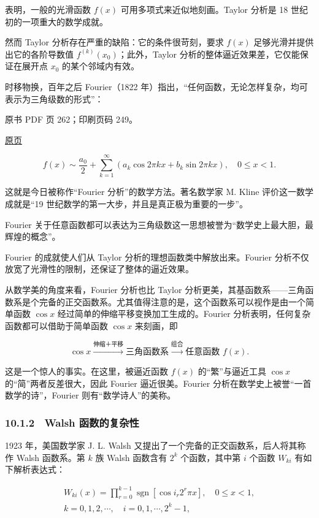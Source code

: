 表明，一般的光滑函数 \(f(x)\) 可用多项式来近似地刻画。Taylor 分析是 18 世纪初的一项重大的数学成就。

然而 Taylor 分析存在严重的缺陷：它的条件很苛刻，要求 \(f(x)\) 足够光滑并提供出它的各阶导数值 \(f^{(k)}(x_0)\)；此外，Taylor 分析的整体逼近效果差，它仅能保证在展开点 \(x_0\) 的某个邻域内有效。

时移物换，百年之后 Fourier（1822 年）指出，``任何函数，无论怎样复杂，均可表示为三角级数的形式''：

\clearpage

原书 PDF 页 262；印刷页码 249。

\href{source-images/pdf-262.jpeg}{原页}

\[
f(x)\sim\frac{a_0}{2}+\sum_{k=1}^{\infty}(a_k\cos2\pi kx+b_k\sin2\pi kx),\quad 0\leqslant x<1.
\]

这就是今日被称作``Fourier 分析''的数学方法。著名数学家 M. Kline 评价这一数学成就是``19 世纪数学的第一大步，并且是真正极为重要的一步''。

Fourier 关于任意函数都可以表达为三角级数这一思想被誉为``数学史上最大胆，最辉煌的概念''。

Fourier 的成就使人们从 Taylor 分析的理想函数类中解放出来。Fourier 分析不仅放宽了光滑性的限制，还保证了整体的逼近效果。

从数学美的角度来看，Fourier 分析也比 Taylor 分析更美，其基函数系------三角函数系是个完备的正交函数系。尤其值得注意的是，这个函数系可以视作是由一个简单函数 \(\cos x\) 经过简单的伸缩平移变换加工生成的。Fourier 分析表明，任何复杂函数都可以借助于简单函数 \(\cos x\) 来刻画，即

\[
\cos x\xrightarrow{\text{伸缩＋平移}}\text{三角函数系}\xrightarrow{\text{组合}}\text{任意函数 }f(x).
\]

这是一个惊人的事实。在这里，被逼近函数 \(f(x)\) 的``繁''与逼近工具 \(\cos x\) 的``简''两者反差很大，因此 Fourier 逼近很美。Fourier 分析在数学史上被誉``一首数学的诗''，Fourier 则有``数学诗人''的美称。

\subsubsection{10.1.2　Walsh 函数的复杂性}\label{ch10-walsh-ux51fdux6570ux7684ux590dux6742ux6027}

1923 年，美国数学家 J. L. Walsh 又提出了一个完备的正交函数系，后人将其称作 Walsh 函数系。第 \(k\) 族 Walsh 函数含有 \(2^k\) 个函数，其中第 \(i\) 个函数 \(W_{ki}\) 有如下解析表达式：

\[
\begin{gathered}
W_{ki}(x)=\prod_{r=0}^{k-1}\operatorname{sgn}[\cos i_r2^r\pi x],\quad 0\leqslant x<1,\\
k=0,1,2,\cdots,\quad i=0,1,\cdots,2^k-1,
\end{gathered}
\]

